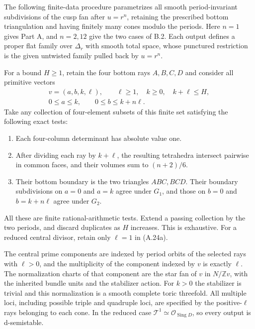 \begin{theorem}\label{push:src:A.2.4}\label{push:A24}
The following finite-data procedure parametrizes all smooth
period-invariant subdivisions of the cusp fan after
$u=r^n$, retaining the prescribed bottom triangulation and
having finitely many cones modulo the periods. Here $n=1$
gives Part A, and $n=2,12$ give the two cases of B.2.
Each output defines a proper flat family over $\Delta_r$
with smooth total space, whose punctured restriction is the
given untwisted family pulled back by $u=r^n$.

For a bound $H\geq1$, retain the four bottom rays
$A,B,C,D$ and consider all primitive vectors
\[
 \begin{gathered}
 v=(a,b,k,\ell),\qquad
 \ell\geq1,\quad k\geq0,\quad k+\ell\leq H,\\
 0\leq a\leq k,\qquad0\leq b\leq k+n\ell.
 \end{gathered}
 \tag{A.24a}
\]
Take any collection of four-element subsets of this finite
set satisfying the following exact tests:
\begin{enumerate}
\item Each four-column determinant has absolute value one.
\item After dividing each ray by $k+\ell$, the resulting
tetrahedra intersect pairwise in common faces, and their
volumes sum to $(n+2)/6$.
\item Their bottom boundary is the two triangles $ABC,BCD$.
Their boundary subdivisions on $a=0$ and $a=k$ agree under
$G_1$, and those on $b=0$ and $b=k+n\ell$ agree under $G_2$.
\end{enumerate}
All these are finite rational-arithmetic tests. Extend a
passing collection by the two periods, and discard duplicates
as $H$ increases. This is exhaustive. For a reduced central
divisor, retain only $\ell=1$ in (A.24a).

The central prime components are indexed by period orbits of
the selected rays with $\ell>0$, and the multiplicity of the
component indexed by $v$ is exactly $\ell$. The normalization
charts of that component are the star fan of $v$ in
$N/\mathbb Zv$, with the inherited bundle units and the
stabilizer action. For $k>0$ the stabilizer is trivial and this
normalization is a smooth complete toric threefold. All
multiple loci, including possible triple and quadruple loci,
are specified by the positive-$\ell$ rays belonging to each
cone. In the reduced case
$\mathcal T^1\simeq\mathcal O_{\operatorname{Sing}D}$,
so every output is d-semistable.
\end{theorem}
